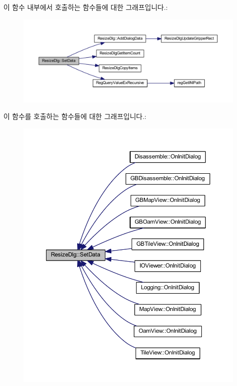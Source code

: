 이 함수 내부에서 호출하는 함수들에 대한 그래프입니다.\+:
\nopagebreak
\begin{figure}[H]
\begin{center}
\leavevmode
\includegraphics[width=350pt]{class_resize_dlg_a6a3965f44a0c2f5ba9aaa798a9a81df5_cgraph}
\end{center}
\end{figure}
이 함수를 호출하는 함수들에 대한 그래프입니다.\+:
\nopagebreak
\begin{figure}[H]
\begin{center}
\leavevmode
\includegraphics[width=350pt]{class_resize_dlg_a6a3965f44a0c2f5ba9aaa798a9a81df5_icgraph}
\end{center}
\end{figure}
\mbox{\label{class_resize_dlg_ae2d0d2b44dd32f668c6d9091b14bfc00}} 
